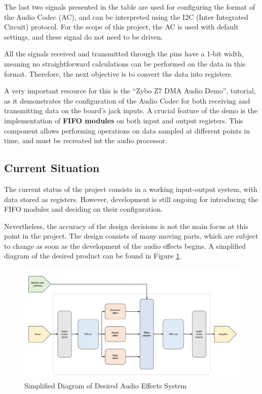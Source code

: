 The last two signals presented in the table are used for configuring the format of the Audio Codec (AC), and can be interpreted using the I2C (Inter Integrated Circuit)\cite{i2c} protocol. For the scope of this project, the AC is used with default settings, and these signal do not need to be driven.


All the signals received and transmitted through the pins have a 1-bit width, meaning no straightforward calculations can be performed on the data in this format. Therefore, the next objective is to convert the data into registers.

A very important resource for this is the ``Zybo Z7 DMA Audio Demo''\cite{dma-demo}, tutorial, as it demonstrates the configuration of the Audio Codec for both receiving and transmitting data on the board's jack inputs. A crucial feature of the demo is the implementation of \textbf{FIFO modules} on both input and output registers. This component allows performing operations on data sampled at different points in time, and must be recreated int the audio processor.

\subsection{Current Situation}
The current status of the project consists in a working input-output system, with data stored as registers. However, development is still ongoing for introducing the FIFO modules and deciding on their configuration.

Nevertheless, the accuracy of the design decisions is not the main focus at this point in the project. The design consists of many moving parts, which are subject to change as soon as the development of the audio effects begins. A simplified diagram of the desired product can be found in Figure \ref{fig:system-diagram}.

\begin{figure}[h]
    \centering
    \includegraphics[width=1\linewidth]{progress-report/system-diagram.png}
    \caption{Simplified Diagram of Desired Audio Effects System}
    \label{fig:system-diagram}
\end{figure}
